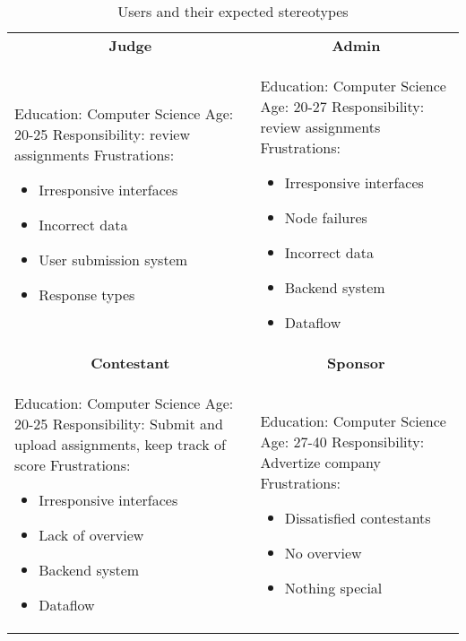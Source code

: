 \begin{longtable}{|m{2.9837599in}|m{3.1087599in}|}
    \caption{Users and their expected stereotypes} \label{table:users} \\
\hline
\multicolumn{1}{|c|}{\textbf{Judge}} & 
\multicolumn{1}{c|}{\textbf{Admin}}  \\
Education: Computer Science \newline
Age: 20-25 \newline
Responsibility: review assignments \newline
Frustrations:
\begin{itemize}[nosep]
    \item Irresponsive interfaces
    \item Incorrect data
    \item User submission system
    \item Response types
\end{itemize}
 &
Education: Computer Science \newline
Age: 20-27 \newline
Responsibility: review assignments \newline
Frustrations:
\begin{itemize}[nosep]
    \item Irresponsive interfaces
    \item Node failures
    \item Incorrect data
    \item Backend system
    \item Dataflow
\end{itemize}
\\\hline


\multicolumn{1}{|c|}{\textbf{Contestant}} & 
\multicolumn{1}{c|}{\textbf{Sponsor}}  \\
Education: Computer Science \newline 
Age: 20-25 \newline 
Responsibility: Submit and upload assignments, keep track of score \newline
Frustrations:
\begin{itemize}[nosep]
    \item Irresponsive interfaces
    \item Lack of overview
    \item Backend system
    \item Dataflow
\end{itemize}
 &
Education: Computer Science \newline
Age: 27-40 \newline
Responsibility: Advertize company \newline
Frustrations:
\begin{itemize}[nosep]
    \item Dissatisfied contestants
    \item No overview
    \item Nothing special
\end{itemize}
\\\hline


\end{longtable}
